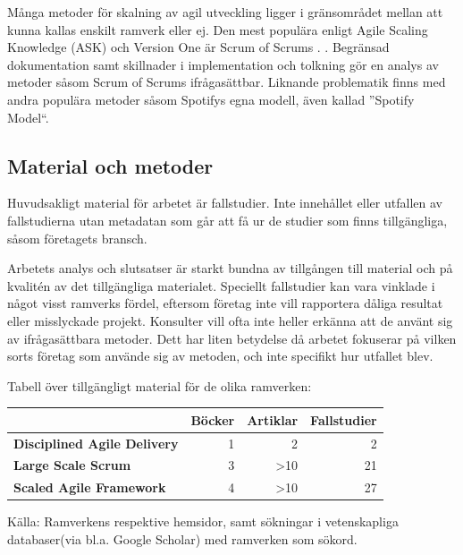 		Många metoder för skalning av agil utveckling ligger i gränsområdet mellan att kunna kallas enskilt ramverk eller ej. Den mest populära enligt Agile Scaling Knowledge (ASK) och Version One är Scrum of Scrums \cite{ask_matrix} \cite{version_one_report}. . Begränsad dokumentation samt skillnader i implementation och tolkning gör en analys av metoder såsom Scrum of Scrums ifrågasättbar. Liknande problematik finns med andra populära metoder såsom Spotifys egna modell, även kallad ''Spotify Model``.
		
	\subsection{Material och metoder}
		
		Huvudsakligt material för arbetet är fallstudier. Inte innehållet eller utfallen av fallstudierna utan metadatan som går att få ur de studier som finns tillgängliga, såsom företagets bransch.
				
		Arbetets analys och slutsatser är starkt bundna av tillgången till material och på kvalitén av det tillgängliga materialet. Speciellt fallstudier kan vara vinklade i något visst ramverks fördel, eftersom företag inte vill rapportera dåliga resultat eller misslyckade projekt. Konsulter vill ofta inte heller erkänna att de använt sig av ifrågasättbara metoder.
		Dett har liten betydelse då arbetet fokuserar på vilken sorts företag som använde sig av metoden, och inte specifikt hur utfallet blev.
		
		
		Tabell över tillgängligt material för de olika ramverken:
	
		\begin{center}
		\begin{tabular}{ >{\bfseries}l | r | r | r }
			 	 						& Böcker & Artiklar & Fallstudier 	\\ \hline
			Disciplined Agile Delivery 	& 1 	& 2			& 2 			\\ \hline
			Large Scale Scrum 			& 3 	& >10		& 21 			\\ \hline
			Scaled Agile Framework 		& 4 	& >10		& 27 			\\ 
		\end{tabular}
		\end{center}
		
		Källa: Ramverkens respektive hemsidor\cite{dad_web, less_web, safe_web}, samt sökningar i vetenskapliga databaser(via bl.a. Google Scholar) med ramverken som sökord.
		
